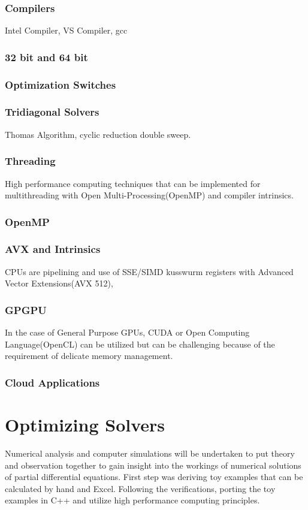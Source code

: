 \documentclass[12pt, oneside]{book}
\theoremstyle{plain}
\theoremstyle{definition}
\begin{document}
\subsection{Compilers}
Intel Compiler, VS Compiler, gcc

\subsection{32 bit and 64 bit}

\subsection{Optimization Switches}

\subsection{Tridiagonal Solvers}
Thomas Algorithm, cyclic reduction double sweep.
\subsection{Threading}
High performance computing techniques that can be implemented for multithreading with Open Multi-Processing(OpenMP) and compiler intrinsics.
\subsection{OpenMP}
\subsection{AVX and Intrinsics}
CPUs are pipelining and use of SSE/SIMD kusswurm registers with Advanced Vector Extensions(AVX 512),
\subsection{GPGPU}
 In the case of General Purpose GPUs, CUDA or Open Computing Language(OpenCL) can be utilized but can be challenging because of the requirement of delicate memory management.

\subsection{Cloud Applications}

\chapter{Optimizing Solvers}
Numerical analysis and computer simulations will be undertaken to put theory and observation together to gain insight into the workings of numerical solutions of partial differential equations. First step was deriving toy examples that can be calculated by hand and Excel. Following the verifications, porting the toy examples in C++ and utilize high performance computing principles.
\end{document}
